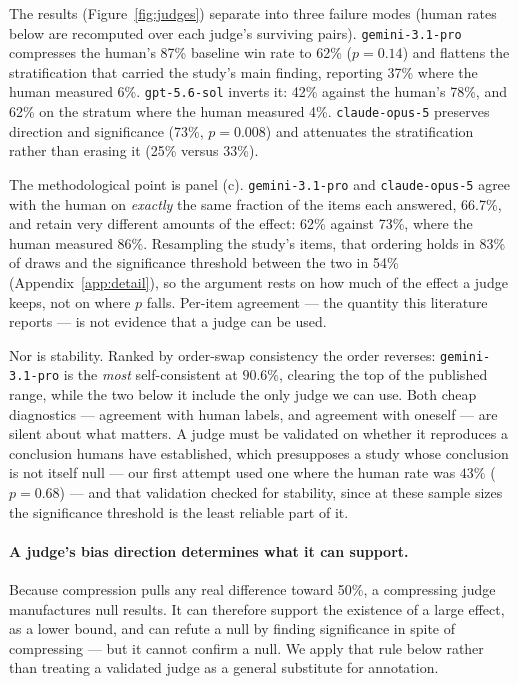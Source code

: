 \documentclass{article}
\begin{document}
The results (Figure~\ref{fig:judges}) separate into three failure modes
(human rates below are recomputed over each judge's surviving pairs).
\texttt{gemini-3.1-pro} compresses the human's 87\% baseline win rate to 62\%
($p{=}0.14$) and flattens the stratification that carried the study's main
finding, reporting 37\% where the human measured 6\%.
\texttt{gpt-5.6-sol} inverts it: 42\% against the human's 78\%, and 62\% on
the stratum where the human measured 4\%. \texttt{claude-opus-5} preserves
direction and significance (73\%, $p{=}0.008$) and attenuates the
stratification rather than erasing it (25\% versus 33\%).

The methodological point is panel (c). \texttt{gemini-3.1-pro} and
\texttt{claude-opus-5} agree with the human on \emph{exactly} the same
fraction of the items each answered, 66.7\%, and retain very different amounts of the effect:
62\% against 73\%, where the human measured 86\%. Resampling the study's
items, that ordering holds in 83\% of draws and the significance threshold
between the two in 54\% (Appendix~\ref{app:detail}), so the argument rests
on how much of the effect a judge keeps, not on where $p$ falls. Per-item
agreement --- the quantity this literature reports --- is not evidence that a
judge can be used.

Nor is stability. Ranked by order-swap consistency the order reverses:
\texttt{gemini-3.1-pro} is the \emph{most} self-consistent at $90.6\%$,
clearing the top of the published range, while the two below it include the
only judge we can use. Both cheap diagnostics --- agreement with human labels,
and agreement with oneself --- are silent about what matters. A judge must be
validated on whether it reproduces a conclusion humans have established, which
presupposes a study whose conclusion is not itself null --- our first attempt
used one where the human rate was $43\%$ ($p{=}0.68$) --- and that validation
checked for stability, since at these sample sizes the significance threshold
is the least reliable part of it.

\paragraph{A judge's bias direction determines what it can support.} Because
compression pulls any real difference toward 50\%, a compressing judge
manufactures null results. It can therefore support the existence of a large
effect, as a lower bound, and can refute a null by finding significance in
spite of compressing --- but it cannot confirm a null. We apply that rule
below rather than treating a validated judge as a general substitute for
annotation.
\end{document}

